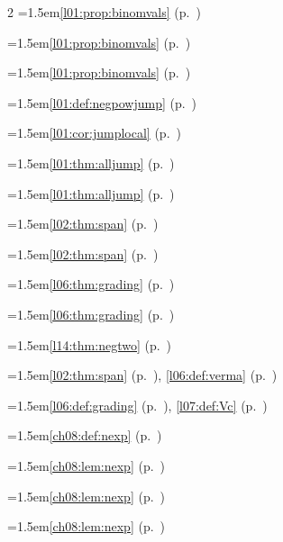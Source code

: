 \begin{multicols}{2}
\hangindent=1.5em\quad \ref{l01:prop:binomvals} (p.~\pageref{l01:prop:binomvals})\par
\hangindent=1.5em\quad \ref{l01:prop:binomvals} (p.~\pageref{l01:prop:binomvals})\par
\hangindent=1.5em\quad \ref{l01:prop:binomvals} (p.~\pageref{l01:prop:binomvals})\par
\hangindent=1.5em\quad \ref{l01:def:negpowjump} (p.~\pageref{l01:def:negpowjump})\par
\hangindent=1.5em\quad \ref{l01:cor:jumplocal} (p.~\pageref{l01:cor:jumplocal})\par
\hangindent=1.5em\quad \ref{l01:thm:alljump} (p.~\pageref{l01:thm:alljump})\par
\hangindent=1.5em\quad \ref{l01:thm:alljump} (p.~\pageref{l01:thm:alljump})\par
\hangindent=1.5em\quad \ref{l02:thm:span} (p.~\pageref{l02:thm:span})\par
\hangindent=1.5em\quad \ref{l02:thm:span} (p.~\pageref{l02:thm:span})\par
\hangindent=1.5em\quad \ref{l06:thm:grading} (p.~\pageref{l06:thm:grading})\par
\hangindent=1.5em\quad \ref{l06:thm:grading} (p.~\pageref{l06:thm:grading})\par
\hangindent=1.5em\quad \ref{l14:thm:negtwo} (p.~\pageref{l14:thm:negtwo})\par
\hangindent=1.5em\quad \ref{l02:thm:span} (p.~\pageref{l02:thm:span}), \ref{l06:def:verma} (p.~\pageref{l06:def:verma})\par
\hangindent=1.5em\quad \ref{l06:def:grading} (p.~\pageref{l06:def:grading}), \ref{l07:def:Vc} (p.~\pageref{l07:def:Vc})\par
\hangindent=1.5em\quad \ref{ch08:def:nexp} (p.~\pageref{ch08:def:nexp})\par
\hangindent=1.5em\quad \ref{ch08:lem:nexp} (p.~\pageref{ch08:lem:nexp})\par
\hangindent=1.5em\quad \ref{ch08:lem:nexp} (p.~\pageref{ch08:lem:nexp})\par
\hangindent=1.5em\quad \ref{ch08:lem:nexp} (p.~\pageref{ch08:lem:nexp})\par

\end{multicols}
